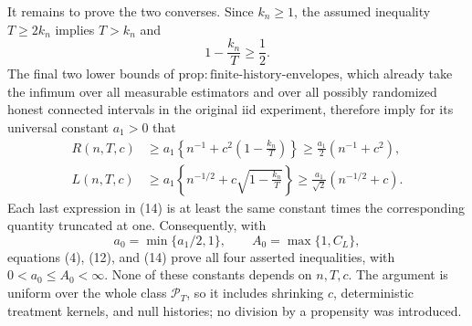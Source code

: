 It remains to prove the two converses.  Since \(k_n\geq1\), the assumed inequality \(T\geq2k_n\) implies \(T>k_n\) and
\[
1-\frac{k_n}{T}\geq\frac12.
\tag{13}
\]
The final two lower bounds of \(\mathrm{prop:finite\text{-}history\text{-}envelopes}\), which already take the infimum over all measurable estimators and over all possibly randomized honest connected intervals in the original iid experiment, therefore imply for its universal constant \(a_1>0\) that
\[
\begin{aligned}
R(n,T,c)
&\geq a_1\left\{n^{-1}+c^2\left(1-\frac{k_n}{T}\right)\right\}
\geq\frac{a_1}{2}(n^{-1}+c^2),\\
L(n,T,c)
&\geq a_1\left\{n^{-1/2}+c\sqrt{1-\frac{k_n}{T}}\right\}
\geq\frac{a_1}{\sqrt2}(n^{-1/2}+c).
\end{aligned}
\tag{14}
\]
Each last expression in (14) is at least the same constant times the corresponding quantity truncated at one.  Consequently, with
\[
a_0=\min\{a_1/2,1\},
\qquad
A_0=\max\{1,C_L\},
\tag{15}
\]
equations (4), (12), and (14) prove all four asserted inequalities, with \(0<a_0\leq A_0<\infty\).  None of these constants depends on \(n,T,c\).  The argument is uniform over the whole class \(\mathcal P_T\), so it includes shrinking \(c\), deterministic treatment kernels, and null histories; no division by a propensity was introduced.
